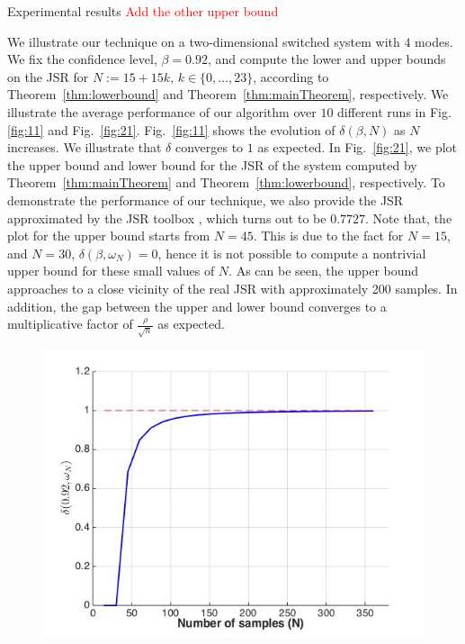 \begin{subsection}{Experimental results}
\textcolor{red}{Add the other upper bound}

We illustrate our technique on a two-dimensional switched system with $4$ modes. We fix the confidence level, \mbox{$\beta = 0.92$}, and compute the lower and upper bounds on the JSR for $N:=15+15k,\, k \in\{0, \ldots, 23\}$, according to Theorem~\ref{thm:lowerbound} and Theorem~\ref{thm:mainTheorem}, respectively. We illustrate the average performance of our algorithm over $10$ different runs in Fig.~ \ref{fig:11} and Fig.~\ref{fig:21}. Fig.~\ref{fig:11} shows the evolution of $\delta(\beta, N)$ as $N$ increases. We illustrate that $\delta$ converges to $1$ as expected. In Fig.~\ref{fig:21}, we plot the upper bound and lower bound for the JSR of the system computed by Theorem~\ref{thm:mainTheorem} and Theorem~\ref{thm:lowerbound}, respectively. To demonstrate the performance of our technique, we also provide the JSR approximated by the JSR toolbox \cite{jsrtoolbox}, which turns out to be $0.7727$. Note that, the plot for the upper bound starts from $N=45$. This is due to the fact for $N=15$, and $N=30$, $\delta(\beta, \omega_N) = 0$, hence it is not possible to compute a nontrivial upper bound for these small values of $N$. As can be seen, the upper bound approaches to a close vicinity of the real JSR with approximately 200 samples. In addition, the gap between the upper and lower bound converges to a multiplicative factor of $\frac{\rho}{\sqrt{n}}$ as expected.

\begin{figure}
\begin{center}
\includegraphics[trim = 5mm 5mm 5mm 5mm, scale=0.35]{delta1.jpg}


\end{center}
\end{figure}
\end{subsection}
